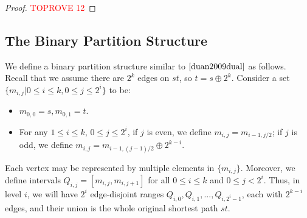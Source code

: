 \documentclass[11pt]{article}
\theoremstyle{plain}
\theoremstyle{definition}
\newcommand{\set}[1]{\{ #1 \}}
\begin{document}
\begin{center}
\begin{tikzpicture}[x=0.75pt,y=0.75pt,yscale=-1,xscale=1]
\end{tikzpicture}
 \end{center}

\begin{proof}\textcolor{red}{TOPROVE 12}\end{proof}



\subsection{The Binary Partition Structure}
\label{sec:binary}

We define a binary partition structure similar to $\cite{duan2009dual}$ as follows. Recall that we assume there are $2^k$ edges on $st$, so $t=s \oplus 2^k$. Consider a set $\set{m_{i,j}|0 \leq i \leq k, 0 \leq j \leq 2^i}$ to be:

\begin{itemize}
    \item $m_{0,0} = s, m_{0,1}=t$.
    \item For any $1 \leq i \leq k$, $0 \leq j \leq 2^i$, if $j$ is even, we define $m_{i,j}=m_{i-1,j/2}$; if $j$ is odd, we define $m_{i,j}=m_{i-1,(j-1)/2} \oplus 2^{k-i}$.
\end{itemize}

Each vertex may be represented by multiple elements in $\set{m_{i,j}}$. Moreover, we define intervals $Q_{i,j} = [m_{i,j},m_{i,j+1}]$ for all $0 \leq i \leq k$ and $0 \leq j < 2^i$. Thus, in level $i$, we will have $2^i$ edge-disjoint ranges
$Q_{i,0}, Q_{i,1}, ..., Q_{i,2^i-1}$, each with $2^{k-i}$ edges, and their union is the whole original shortest path $st$.
\end{document}
